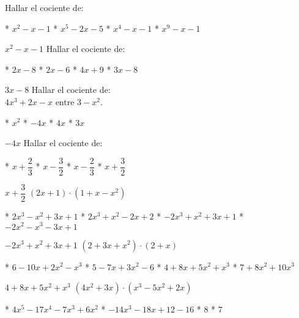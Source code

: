 Hallar el cociente de:
\begin{figure}[h]
\end{figure}
\begin{enum}
  * $x^2-x-1$
  * $x^5-2x-5$
  * $x^4-x-1$
  * $x^9-x-1$
\end{enum}
$x^2-x-1$
Hallar el cociente de:
\begin{figure}[h]
\end{figure}
\begin{enum}
  * $2x-8$
  * $2x-6$
  * $4x+9$
  * $3x-8$
\end{enum}
$3x-8$
Hallar el cociente de: \\
$4x^3+2x-x$ entre $3-x^2$.
\begin{enum}
  * $x^2$
  * $-4x$
  * $4x$
  * $3x$
\end{enum}
$-4x$
Hallar el cociente de:
\begin{figure}[h]
\end{figure}
\begin{enum}
  * $x+\dfrac23$
  * $x-\dfrac32$
  * $x-\dfrac23$
  * $x+\dfrac32$
\end{enum}
$x+\dfrac32$
$(2x+1)\cdot\left(1+x-x^2\right)$
\begin{enum}
  * $2x^3-x^2+3x+1$
  * $2x^3+x^2-2x+2$
  * $-2x^3+x^2+3x+1$
  * $-2x^2-x^3-3x+1$
\end{enum}
$-2x^3+x^2+3x+1$
$\left(2+3x+x^2\right)\cdot(2+x)$
\begin{enum}
  * $6-10x+2x^2-x^3$
  * $5-7x+3x^2-6$
  * $4+8x+5x^2+x^3$
  * $7+8x^2+10x^3$
\end{enum}
$4+8x+5x^2+x^3$
$\left(4x^2+3x\right)\cdot\left(x^3-5x^2+2x\right)$
\begin{enum}
  * $4x^5-17x^4-7x^3+6x^2$
  * $-14x^3-18x+12-16$
  * $8$
  * $7$
\end{enum}
